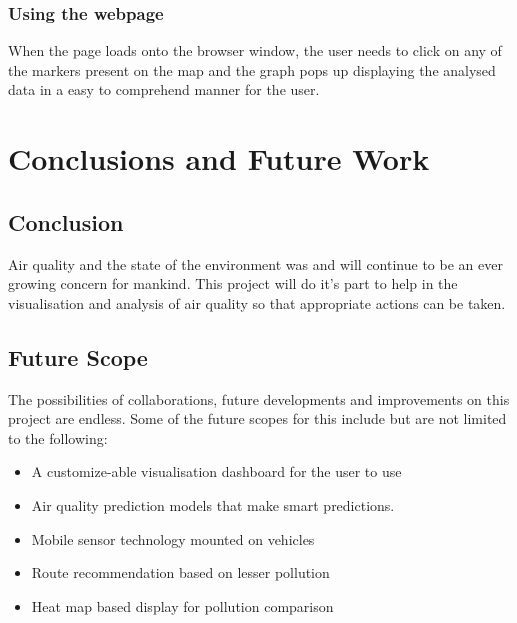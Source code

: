 \documentclass[]{report}
\begin{document}
\subsection{Using the webpage}
When the page loads onto the browser window, the user needs to click on any of the markers present on the map and the graph pops up displaying the analysed data in a easy to comprehend manner for the user.





\chapter{Conclusions and Future Work}
\section{Conclusion}
Air quality and the state of the environment was and will continue to be an ever growing concern for mankind. This project will do it's part to help in the visualisation and analysis of air quality so that appropriate actions can be taken.
\section{Future Scope}
The possibilities of collaborations, future developments and improvements on this project are endless. Some of the future scopes for this include but are not limited to the following:
\newline
\begin{itemize}
    \item A customize-able visualisation dashboard for the user to use
    \item Air quality prediction models that make smart predictions. 
    \item Mobile sensor technology mounted on vehicles 
    \item Route recommendation based on lesser pollution 
    \item Heat map based display for pollution comparison 

\end{itemize}
\end{document}
